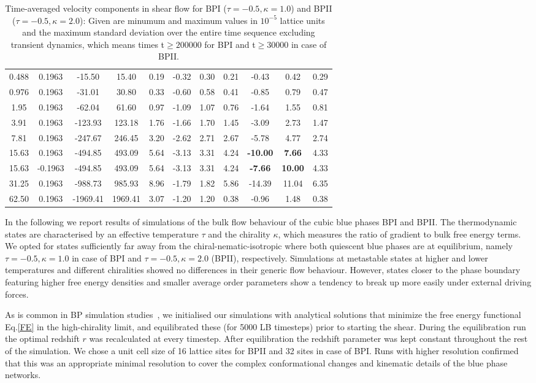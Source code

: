\documentclass[aps,pre,reprint,superscriptaddress, twocolumn]{revtex4}
\begin{document}
\begin{table}[htpb]
\begin{tabular}{|c|| c || c |c |c||c| c| c||c| c| c|}
0.488 &0.1963 &-15.50 &15.40 &0.19 &-0.32 &0.30 &0.21 &-0.43 &0.42 &0.29 \\
0.976 &0.1963 &-31.01 &30.80 &0.33 &-0.60 &0.58 &0.41 &-0.85 &0.79 &0.47 \\
1.95 & 0.1963 &-62.04  &61.60 & 0.97 & -1.09 &1.07 & 0.76 & -1.64 & 1.55 & 0.81\\
3.91 & 0.1963 &-123.93 &123.18 & 1.76 &-1.66 &1.70 & 1.45 &-3.09& 2.73 &1.47\\
7.81 &0.1963  &-247.67 &246.45 & 3.20 &-2.62 &2.71 & 2.67 &-5.78 & 4.77 &2.74\\
15.63 &0.1963 &-494.85 &493.09 & 5.64 &-3.13 &3.31 &4.24 &\bf{-10.00} & \bf{7.66} &4.33\\
15.63 &-0.1963&-494.85 &493.09 & 5.64 & -3.13 &3.31 &4.24 &\bf{-7.66} & \bf{10.00} &4.33\\
31.25 &0.1963 &-988.73 &985.93 &8.96  &-1.79 &1.82 &5.86 &-14.39 & 11.04 &6.35\\
62.50 &0.1963 & -1969.41  & 1969.41 & 3.07 & -1.20 & 1.20 & 0.38 &-0.96 & 1.48 &0.38 \\
\hline
\end{tabular}
\caption{Time-averaged velocity components in shear flow for BPI ($\tau=-0.5, \kappa=1.0$) and BPII ($\tau=-0.5, \kappa=2.0$): Given are minumum and maximum values in $10^{-5}$ lattice units and the maximum standard deviation over the entire time sequence excluding transient dynamics, which means times t$\ge 200000$ for BPI and t$\ge 30000$ in case of BPII.
\label{tab1}}
\end{table}

In the following we report results of simulations of the bulk flow behaviour of the cubic blue 
phases BPI and BPII. The thermodynamic states are characterised by an effective temperature 
$\tau$ and the chirality $\kappa$, which measures the ratio of gradient to bulk free energy terms.
We opted for states sufficiently far away from the chiral-nematic-isotropic 
where both quiescent blue phases are at equilibrium, namely
$\tau=-0.5, \kappa=1.0$ in case of BPI and $\tau=-0.5, \kappa=2.0$ (BPII), respectively.
Simulations at metastable states at higher and lower temperatures and different chiralities showed 
no differences in their generic flow behaviour.
However, states closer to the phase boundary featuring higher free energy densities and 
smaller average order parameters show a tendency to break up more easily under external driving forces.

As is common in BP simulation studies~\cite{Henrich:2011a,Henrich:2010b}, we initialised our simulations with 
analytical solutions that minimize the free energy functional Eq.\ref{FE} in the high-chirality limit, 
and equilibrated these (for 5000 LB timesteps) prior to starting the shear. 
During the equilibration run the optimal redshift $r$ was recalculated at every timestep.
After equilibration the redshift parameter was kept constant throughout the rest of the simulation.
We chose a unit cell size of 16 lattice sites for BPII and 32 sites in case of BPI. 
Runs with higher resolution confirmed that this was an appropriate minimal resolution to cover 
the complex conformational changes and kinematic details of the blue phase networks.
\end{document}
